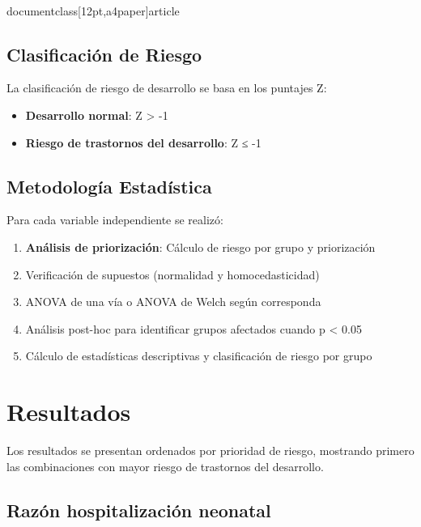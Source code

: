 \\documentclass[12pt,a4paper]{article}
\begin{document}
\subsection{Clasificación de Riesgo}

La clasificación de riesgo de desarrollo se basa en los puntajes Z:

\begin{itemize}
\item \textbf{Desarrollo normal}: Z > -1
\item \textbf{Riesgo de trastornos del desarrollo}: Z ≤ -1
\end{itemize}

\subsection{Metodología Estadística}

Para cada variable independiente se realizó:

\begin{enumerate}
\item \textbf{Análisis de priorización}: Cálculo de riesgo por grupo y priorización
\item Verificación de supuestos (normalidad y homocedasticidad)
\item ANOVA de una vía o ANOVA de Welch según corresponda
\item Análisis post-hoc para identificar grupos afectados cuando p < 0.05
\item Cálculo de estadísticas descriptivas y clasificación de riesgo por grupo
\end{enumerate}

\section{Resultados}

Los resultados se presentan ordenados por prioridad de riesgo, mostrando primero las combinaciones con mayor riesgo de trastornos del desarrollo.


\subsection{Razón hospitalización neonatal}
\end{document}
